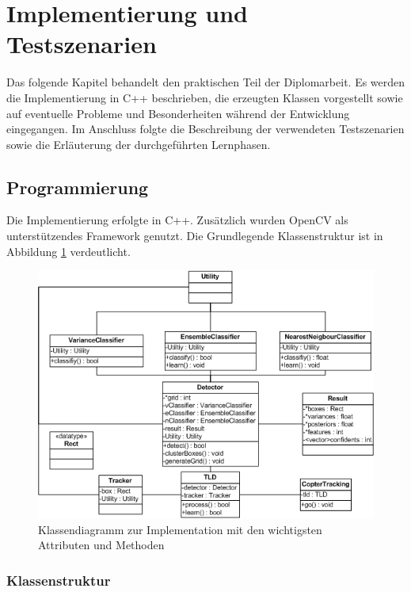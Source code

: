 \section{Implementierung und Testszenarien}
Das folgende Kapitel behandelt den praktischen Teil der Diplomarbeit. Es werden die Implementierung in C++ beschrieben, die erzeugten Klassen vorgestellt sowie auf eventuelle Probleme und Besonderheiten während der Entwicklung eingegangen. Im Anschluss folgte die Beschreibung der verwendeten Testszenarien sowie die Erläuterung der durchgeführten Lernphasen. 

\subsection{Programmierung}
Die Implementierung erfolgte in C++. Zusätzlich wurden OpenCV als unterstützendes Framework genutzt. Die Grundlegende Klassenstruktur ist in Abbildung \ref{klassendiagramm} verdeutlicht.

\begin{figure}
\begin{centering}
\includegraphics{../pictures/Klassendiagrammvsd.jpg}
\caption{Klassendiagramm zur Implementation mit den wichtigsten Attributen und Methoden}
\label{klassendiagramm}
\par\end{centering}
\end{figure}

\subsubsection{Klassenstruktur}
